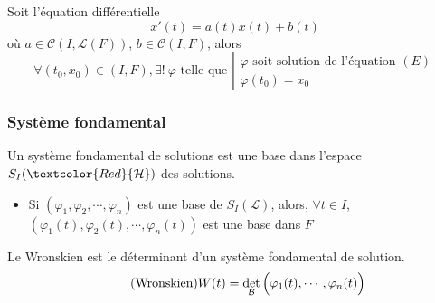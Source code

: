 \documentclass[11pt,a4paper,fleqn,pdftex]{report}
\begin{document}
\begin{itheorem}\label{th:CauchyLipschitz}
Soit l'équation différentielle 
\begin{equation}\tag{$E$}
 x'(t) = a(t) x(t) + b(t)
\end{equation}
où $a \in \mathcal{C}\left( I,\mathcal{L}(F)\right)$, $b\in \mathcal{C}(I,F)$, alors
\[
    \forall (t_0,x_0) \in (I,F), \exists ! \: \varphi \text{ telle que }
    \left|
    \begin{array}{l}
        \varphi \text{ soit solution de l'équation }(E)\\
        \varphi(t_0)=x_0
    \end{array}
    \right.
\]
\end{itheorem}

\subsubsection{Système fondamental}

\begin{dfn}

Un système fondamental de solutions est une base dans l'espace $S_I(\textcolor{Red}{\mathcal{H}})$ des solutions.
\end{dfn}

\begin{prop}
    \begin{itemize}
        \item Si $(\varphi_1, \varphi_2, \cdots , \varphi_n)$ est une base de $S_I(\mathcal{L})$, alors, $\forall t \in I$, $\left( \varphi_1(t), \varphi_2(t), \cdots , \varphi_n(t) \right)
$ est une base dans $ F$
    \end{itemize}
\end{prop}



\begin{dfn}[Wronskien]
Le Wronskien est le déterminant d'un système fondamental de solution. 
\begin{equation}\label{Wronskien}\tag{Wronskien}
  W(t) = \det_\mathcal{B}\left( \vphantom{{3^3}^3} \varphi_1(t),\cdots , \varphi_n(t) \right)
\end{equation}
\end{dfn}

\end{document}
